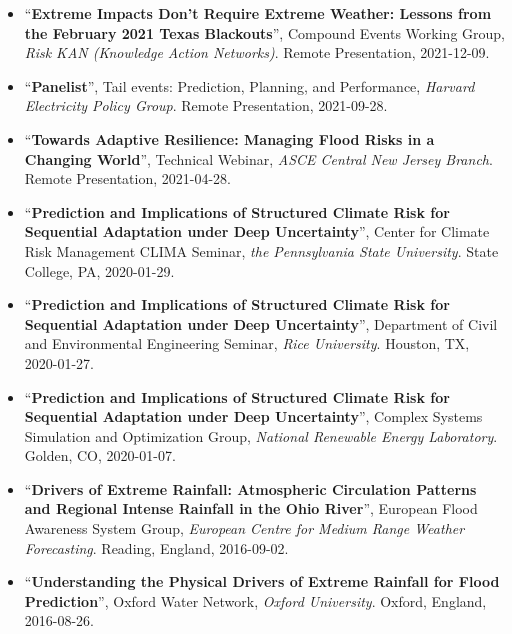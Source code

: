 \documentclass[10pt,oneside]{article}
\begin{document}
\begin{itemize}[label={}]
  \item \enquote{\textbf{Extreme Impacts Don't Require Extreme Weather: Lessons from the February 2021 Texas Blackouts}}, Compound Events Working Group,  \textit{Risk KAN (Knowledge Action Networks)}. Remote Presentation, 2021-12-09.
  
  \item \enquote{\textbf{Panelist}}, Tail events: Prediction, Planning, and Performance,  \textit{Harvard Electricity Policy Group}. Remote Presentation, 2021-09-28.
  
  \item \enquote{\textbf{Towards Adaptive Resilience: Managing Flood Risks in a Changing World}}, Technical Webinar,  \textit{ASCE Central New Jersey Branch}. Remote Presentation, 2021-04-28.
  
  \item \enquote{\textbf{Prediction and Implications of Structured Climate Risk for Sequential Adaptation under Deep Uncertainty}}, Center for Climate Risk Management CLIMA Seminar,  \textit{the Pennsylvania State University}. State College, PA, 2020-01-29.
  
  \item \enquote{\textbf{Prediction and Implications of Structured Climate Risk for Sequential Adaptation under Deep Uncertainty}}, Department of Civil and Environmental Engineering Seminar,  \textit{Rice University}. Houston, TX, 2020-01-27.
  
  \item \enquote{\textbf{Prediction and Implications of Structured Climate Risk for Sequential Adaptation under Deep Uncertainty}}, Complex Systems Simulation and Optimization Group,  \textit{National Renewable Energy Laboratory}. Golden, CO, 2020-01-07.
  
  \item \enquote{\textbf{Drivers of Extreme Rainfall: Atmospheric Circulation Patterns and Regional Intense Rainfall in the Ohio River}}, European Flood Awareness System Group,  \textit{European Centre for Medium Range Weather Forecasting}. Reading, England, 2016-09-02.
  
  \item \enquote{\textbf{Understanding the Physical Drivers of Extreme Rainfall for Flood Prediction}}, Oxford Water Network,  \textit{Oxford University}. Oxford, England, 2016-08-26.
  
\end{itemize}

\end{document}
